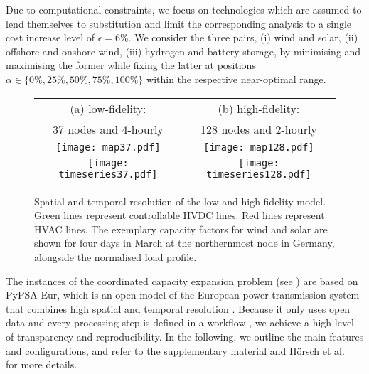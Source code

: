 
Due to computational constraints, we focus on technologies which are assumed to
lend themselves to substitution and limit the corresponding analysis to a single
cost increase level of $\epsilon=6\%$. We consider the three pairs, (i) wind and
solar, (ii) offshore and onshore wind, (iii) hydrogen and battery storage, by
minimising and maximising the former while fixing the latter at positions
$\alpha \in \{0\%,25\%,50\%,75\%,100\%\}$ within the respective near-optimal
range.


\begin{figure}
    \centering
        \begin{tabular}{cc}
            \footnotesize (a) low-fidelity: & \footnotesize (b) high-fidelity: \\
            \footnotesize 37 nodes and 4-hourly & \footnotesize 128 nodes and 2-hourly \\
            \texttt{[image: map37.pdf]} &
            \texttt{[image: map128.pdf]} \\
            \texttt{[image: timeseries37.pdf]} &
            \texttt{[image: timeseries128.pdf]} \\
        \end{tabular}
    \caption[Spatial and temporal resolution of the low and high fidelity model]{Spatial and temporal resolution of the low and high fidelity model.
    Green lines represent controllable HVDC lines. Red lines represent HVAC lines.
    The exemplary capacity factors for wind and solar are shown for four days in March
    at the northernmost node in Germany, alongside the normalised load profile.}
    \label{fig:pypsaeur}
\end{figure}


The instances of the coordinated capacity expansion problem
 (see ) are based on \mbox{PyPSA-Eur}, which is an open model of
 the European power transmission system that combines high spatial and temporal
 resolution \cite{pypsaeur}. Because it only uses open data and every processing
 step is defined in a workflow \cite{snakemake}, we achieve a high level of
 transparency and reproducibility. In the following, we outline the main
 features and configurations, and refer to the supplementary material and Hörsch
 et al.~\cite{pypsaeur} for more details.

